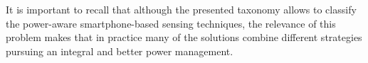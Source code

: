 \documentclass[ENG,PhD]{cinvestav}
\begin{document}
It is important to recall that although the presented taxonomy allows to classify the power-aware smartphone-based sensing techniques, the relevance of this problem makes that in practice many of the solutions combine different strategies pursuing an integral and better power management.
\end{document}
